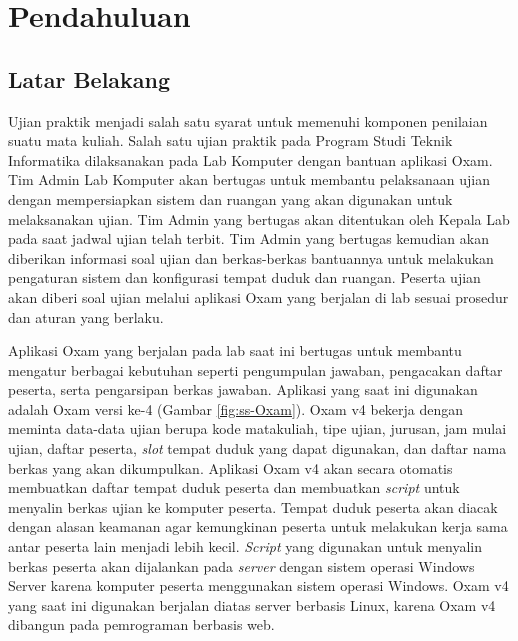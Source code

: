 \chapter{Pendahuluan}
\label{chap:intro}
   
\section{Latar Belakang}
\label{sec:label}
Ujian praktik menjadi salah satu syarat untuk memenuhi komponen penilaian
suatu mata kuliah.
Salah satu ujian praktik pada Program Studi Teknik Informatika 
dilaksanakan pada Lab Komputer dengan bantuan aplikasi Oxam.
Tim Admin Lab Komputer akan bertugas untuk membantu
pelaksanaan ujian dengan mempersiapkan sistem dan ruangan yang akan digunakan
untuk melaksanakan ujian. Tim Admin yang bertugas akan ditentukan oleh Kepala Lab pada 
saat jadwal ujian telah terbit. Tim Admin yang bertugas kemudian akan diberikan informasi soal ujian
dan berkas-berkas bantuannya untuk melakukan pengaturan sistem dan konfigurasi tempat duduk dan ruangan.
Peserta ujian akan diberi soal ujian melalui aplikasi
Oxam yang berjalan di lab sesuai prosedur dan aturan yang berlaku.

Aplikasi Oxam yang berjalan pada lab saat ini bertugas untuk
membantu mengatur berbagai kebutuhan seperti pengumpulan jawaban, pengacakan
daftar peserta, serta pengarsipan berkas jawaban. Aplikasi yang saat ini
digunakan adalah Oxam versi ke-4 (Gambar \ref{fig:ss-Oxam}). Oxam v4 bekerja dengan meminta
data-data ujian berupa kode matakuliah, tipe ujian, jurusan, jam mulai ujian, daftar
peserta, \textit{slot} tempat duduk yang dapat digunakan, dan daftar nama berkas
yang akan dikumpulkan. Aplikasi Oxam v4 akan secara otomatis membuatkan daftar
tempat duduk peserta dan membuatkan \textit{script} untuk
menyalin berkas ujian ke komputer peserta. Tempat duduk peserta akan diacak dengan
alasan keamanan agar kemungkinan peserta untuk melakukan kerja sama antar peserta lain
menjadi lebih kecil. \textit{Script} yang digunakan untuk menyalin berkas peserta akan
dijalankan pada \textit{server} dengan sistem operasi Windows Server karena komputer peserta
menggunakan sistem operasi Windows. Oxam v4 yang saat ini digunakan berjalan diatas server
berbasis Linux, karena Oxam v4 dibangun pada pemrograman berbasis web.

